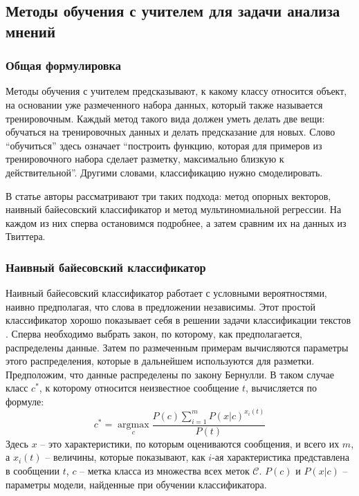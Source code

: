 \subsection{Методы обучения с учителем для задачи анализа мнений}

\subsubsection{Общая формулировка}
Методы обучения с учителем предсказывают, к какому классу относится объект, на основании уже
размеченного набора данных, который также называется тренировочным. Каждый метод такого вида должен
уметь делать две вещи: обучаться на тренировочных данных и делать предсказание для новых. Слово
``обучиться'' здесь означает ``построить функцию, которая для примеров из тренировочного набора
сделает разметку, максимально близкую к действительной''. Другими словами, классификацию нужно смоделировать.

В статье \cite{pang2002thumbs} авторы рассматривают три таких подхода: метод опорных
векторов, наивный байесовский классификатор и метод мультиномиальной регрессии. На каждом из них
сперва остановимся подробнее, а затем сравним их на данных из Твиттера.

\subsubsection{Наивный байесовский классификатор}
Наивный байесовский классификатор \cite{citeulike:11350907} работает с условными вероятностями,
наивно предполагая, что слова в предложении независимы. Этот простой классификатор хорошо показывает
себя в решении задачи классификации текстов \cite{manning1999foundations}. Сперва необходимо выбрать закон,
по которому, как предполагается, распределены данные. Затем по размеченным примерам вычисляются
параметры этого распределения, которые в дальнейшем используются для разметки. Предположим, что данные
распределены по закону Бернулли. В таком случае класс $c^*$, к которому относится
неизвестное сообщение $t$, вычисляется по формуле:
\begin{equation}
c^* = \underset{c}{\operatorname{arg max}} \frac{P(c) \sum\limits_{i=1}^m P(x|c)^{x_i(t)}}{P(t)}
\end{equation}
Здесь $x$ -- это характеристики, по которым оцениваются сообщения, и всего их $m$, а $x_i(t)$ -- величины, которые
показывают, как $i$-ая характеристика представлена в сообщении $t$, $c$ -- метка
класса из множества всех меток $\mathcal{C}$. $P(c)$ и $P(x|c)$ -- параметры
модели, найденные при обучении классификатора.

